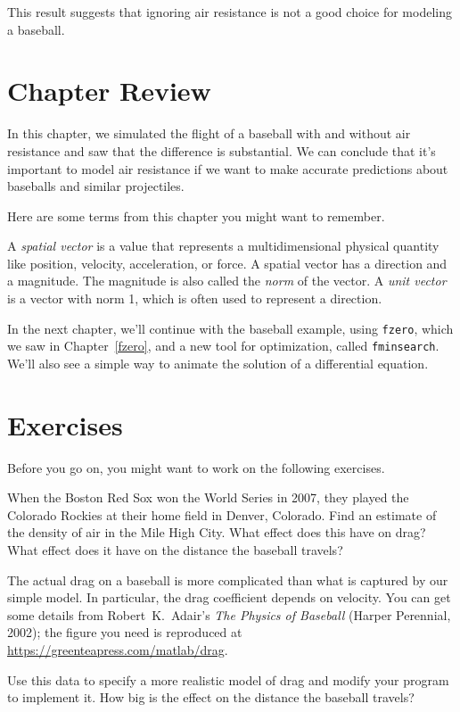 \documentclass[../../book.tex]{subfiles}
\begin{document}
This result suggests that ignoring air resistance is not a good choice for modeling a baseball.

\section{Chapter Review}

In this chapter, we simulated the flight of a baseball with and without air resistance and saw that the difference is substantial.
We can conclude that it's important to model air resistance if we want to make accurate predictions about baseballs and similar projectiles.

Here are some terms from this chapter you might want to remember.

A \emph{spatial vector} is a value that represents a multidimensional physical quantity like position, velocity, acceleration, or force.
A spatial vector has a direction and a magnitude.  The magnitude is also called the \emph{norm} of the vector.
A \emph{unit vector} is a vector with norm 1, which is often used to represent a
direction.

In the next chapter, we'll continue with the baseball example, using \lstinline{fzero}, which we saw in Chapter~\ref{fzero}, and a new tool for optimization, called \lstinline{fminsearch}.  We'll also see a simple way to animate the solution of a differential equation.


\section{Exercises}

Before you go on, you might want to work on the following exercises.

\begin{ex}


When the Boston Red Sox won the World Series in 2007, they played the
Colorado Rockies at their home field in Denver, Colorado.  Find an
estimate of the density of air in the Mile High City.  What effect
does this have on drag?  What effect does it have on the distance the baseball travels?
\end{ex}


\begin{ex}


The actual drag on a baseball is more complicated than what is
captured by our simple model.  In particular, the drag coefficient
depends on velocity.  You can get some details from Robert~K.\ Adair's \emph{The
Physics of Baseball} (Harper Perennial, 2002); the figure you need is reproduced at \url{https://greenteapress.com/matlab/drag}.

Use this data to specify a more realistic model of drag and modify your
program to implement it.  How big is the effect on the distance the baseball travels?
\end{ex}
\end{document}
